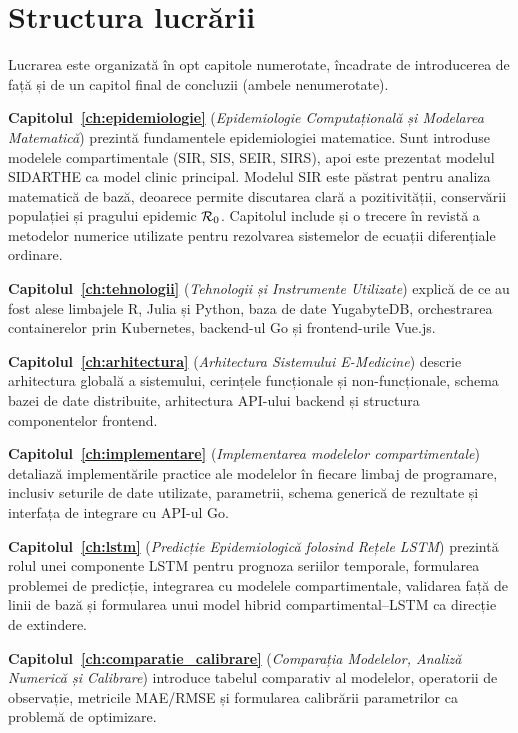 {}
\section*{Structura lucrării}
\label{sec:structura}

Lucrarea este organizată în opt capitole numerotate, încadrate de introducerea
de față și de un capitol final de concluzii (ambele nenumerotate).

\textbf{Capitolul~\ref{ch:epidemiologie}} (\emph{Epidemiologie Computațională și
Modelarea Matematică}) prezintă fundamentele epidemiologiei matematice. Sunt
introduse modelele compartimentale (SIR, SIS, SEIR, SIRS), apoi este prezentat
modelul SIDARTHE ca model clinic principal. Modelul SIR este păstrat pentru
analiza matematică de bază, deoarece permite discutarea clară a pozitivității,
conservării populației și pragului epidemic $\mathcal{R}_0$. Capitolul include și o
trecere în revistă a metodelor numerice utilizate pentru rezolvarea sistemelor de
ecuații diferențiale ordinare.

\textbf{Capitolul~\ref{ch:tehnologii}} (\emph{Tehnologii și Instrumente Utilizate})
explică de ce au fost alese limbajele R, Julia și Python, baza de date
YugabyteDB, orchestrarea containerelor prin Kubernetes, backend-ul Go și
frontend-urile Vue.js.

\textbf{Capitolul~\ref{ch:arhitectura}} (\emph{Arhitectura Sistemului E-Medicine})
descrie arhitectura globală a sistemului, cerințele funcționale și non-funcționale,
schema bazei de date distribuite, arhitectura API-ului backend și structura
componentelor frontend.

\textbf{Capitolul~\ref{ch:implementare}} (\emph{Implementarea modelelor
compartimentale}) detaliază implementările practice ale modelelor în fiecare limbaj de
programare, inclusiv seturile de date utilizate, parametrii, schema generică de
rezultate și interfața de integrare cu API-ul Go.

\textbf{Capitolul~\ref{ch:lstm}} (\emph{Predicție Epidemiologică folosind Rețele
LSTM}) prezintă rolul unei componente LSTM pentru prognoza seriilor temporale,
formularea problemei de predicție, integrarea cu modelele compartimentale,
validarea față de linii de bază și formularea unui model hibrid
compartimental--LSTM ca direcție de extindere.

\textbf{Capitolul~\ref{ch:comparatie_calibrare}} (\emph{Comparația Modelelor,
Analiză Numerică și Calibrare}) introduce tabelul comparativ al modelelor,
operatorii de observație, metricile MAE/RMSE și formularea calibrării
parametrilor ca problemă de optimizare.

